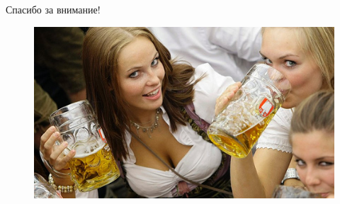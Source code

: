 \documentclass[10pt,pdf,hyperref=unicode,hyperref={bookmarks=false}]{beamer}
\begin{document}
  \section*{}
  \begin{frame}{Спасибо за внимание!}
    \begin{figure}
      \includegraphics[width=\textwidth]{beers1.jpg}
    \end{figure}
  \end{frame}
\end{document}
